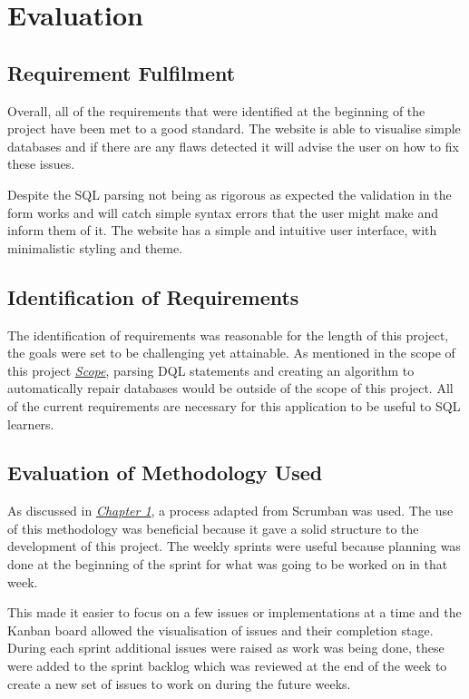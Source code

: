 \chapter{Evaluation}

\section{Requirement Fulfilment}

Overall, all of the requirements that were identified at the beginning of the project have been met to a good standard. The website is able to visualise simple databases and if there are any flaws detected it will advise the user on how to fix these issues. 

Despite the SQL parsing not being as rigorous as expected the validation in the form works and will catch simple syntax errors that the user might make and inform them of it. The website has a simple and intuitive user interface, with minimalistic styling and theme.

\section{Identification of Requirements}

The identification of requirements was reasonable for the length of this project, the goals were set to be challenging yet attainable. As mentioned in the scope of this project \textit{\hyperref[subsec:scope]{Scope}}, parsing DQL statements and creating an algorithm to automatically repair databases would be outside of the scope of this project. All of the current requirements are necessary for this application to be useful to SQL learners.

\section{Evaluation of Methodology Used}

As discussed in \textit{\hyperref[sec:process]{Chapter 1}}, a process adapted from Scrumban was used. The use of this methodology was beneficial because it gave a solid structure to the development of this project. The weekly sprints were useful because planning was done at the beginning of the sprint for what was going to be worked on in that week. 

This made it easier to focus on a few issues or implementations at a time and the Kanban board allowed the visualisation of issues and their completion stage. During each sprint additional issues were raised as work was being done, these were added to the sprint backlog which was reviewed at the end of the week to create a new set of issues to work on during the future weeks. 

